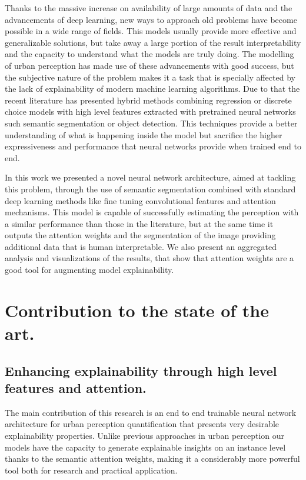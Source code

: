 Thanks to the massive increase on availability of large amounts of data and the advancements
of deep learning, new ways to approach old problems have become possible in a wide
range of fields. This models usually provide more effective and generalizable solutions,
but take away a large portion of the result interpretability and the capacity to understand
what the models are truly doing. The modelling of urban perception has made use
of these advancements with good success, but the subjective nature of the problem
makes it a task that is specially affected by the lack of explainability of modern
machine learning algorithms. Due to that the recent literature has presented hybrid methods
combining regression or discrete choice models with high level features extracted
with pretrained neural networks such semantic segmentation or object detection.
This techniques provide a better understanding of what is happening inside the model
but sacrifice the higher expressiveness and performance that neural networks
provide when trained end to end.

In this work we presented a novel neural network architecture, aimed at tackling this problem,
through the use of semantic segmentation combined with standard deep learning methods like
fine tuning convolutional features and attention mechanisms. This model is capable of
successfully estimating the perception  with a similar performance than those in the literature,
but at the same time it outputs the attention weights and the segmentation of the image providing
additional data that is human interpretable. We also present an aggregated analysis and visualizations
of the results, that show that attention weights are a good tool for augmenting model explainability.

\section{Contribution to the state of the art.}

\subsection{Enhancing explainability through high level features and attention.}
The main contribution of this research is an end to end trainable neural network
architecture for urban perception quantification that presents very desirable
explainability properties. Unlike previous approaches in urban perception our models
have the capacity to generate explainable insights on an instance level thanks to the
semantic attention weights, making it a considerably more powerful tool both
for research and practical application.

